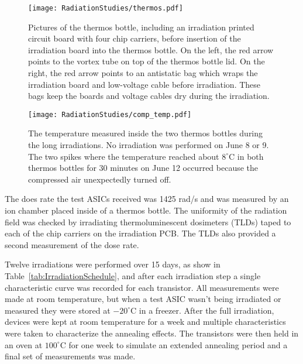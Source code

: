 \begin{figure}[htbp]
\begin{center}
\texttt{[image: RadiationStudies/thermos.pdf]}
\end{center}
\caption{Pictures of the thermos bottle, including an irradiation printed circuit board with four chip carriers, before insertion of the irradiation board into the thermos bottle. On the left, the red arrow points to the vortex tube on top of the thermos bottle lid. On the right, the red arrow points to an antistatic bag which wraps the irradiation board and low-voltage cable before irradiation. These bags keep the boards and voltage cables dry during the irradiation.}
\label{fig:Thermos}
\end{figure}

\begin{figure}[htb!]
\begin{center}
\texttt{[image: RadiationStudies/comp\_temp.pdf]}
\end{center}
\caption{The temperature measured inside the two thermos bottles during the long irradiations. No irradiation was performed on June 8 or 9. The two spikes where the temperature reached about $8^{\circ}\mathrm{C}$ in both thermos bottles for 30 minutes on June 12 occurred because the compressed air unexpectedly turned off.}
\label{fig:Temperature}
\end{figure}

The does rate the test ASICs received was 1425 rad/s and was measured by an ion chamber placed inside of a thermos bottle. The uniformity of the radiation field was checked by irradiating thermoluminescent dosimeters (TLDs) taped to each of the chip carriers on the irradiation PCB. The TLDs also provided a second measurement of the dose rate.

Twelve irradiations were performed over 15 days, as show in Table~\ref{tab:IrradiationSchedule}, and after each irradiation step a single characteristic curve was recorded for each transistor. All measurements were made at room temperature, but when a test ASIC wasn't being irradiated or measured they were stored at $-20^{\circ}\mathrm{C}$ in a freezer. After the full irradiation, devices were kept at room temperature for a week and multiple characteristics were taken to characterize the annealing effects. The transistors were then held in an oven at $100^{\circ}\mathrm{C}$ for one week to simulate an extended annealing period and a final set of measurements was made.

